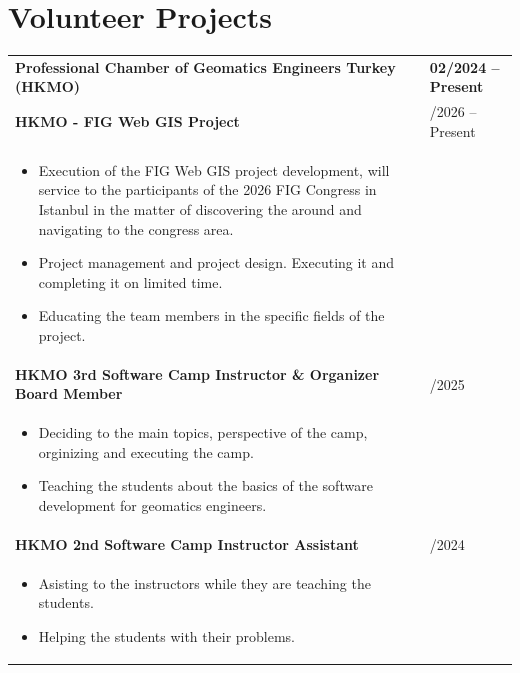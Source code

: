 \documentclass[10pt,a4paper]{article}
\begin{document}
\vspace{-5pt}

\section{Volunteer Projects}
\vspace{-5pt}
\begin{longtable}{@{} p{} | >{\centering\arraybackslash}p{} @{}}
  \textbf{Professional Chamber of Geomatics Engineers Turkey (HKMO) } & \textbf{02/2024 -- Present} \\
  \quad \textbf{\color{cvblue}HKMO - FIG Web GIS Project} & 03/2026 -- Present \\ [-5pt]
  \begin{itemize}
    \item Execution of the FIG Web GIS project development, will service to the participants of the 2026 FIG Congress in Istanbul in the matter of discovering the around and navigating to the congress area.
    \item Project management and project design. Executing it and completing it on limited time.
    \item Educating the team members in the specific fields of the project.
  \end{itemize} & \\ [10pt]

  \vspace{-5pt}
  \quad \textbf{\color{cvblue}HKMO 3rd Software Camp Instructor \& Organizer Board Member} & 02/2025 \\ [-5pt]
  \begin{itemize}
    \item Deciding to the main topics, perspective of the camp, orginizing and executing the camp.
    \item Teaching the students about the basics of the software development for geomatics engineers.
  \end{itemize} & \\ [10pt]

  \vspace{-5pt}
  \quad \textbf{\color{cvblue}HKMO 2nd Software Camp Instructor Assistant} & 02/2024 \\ [-5pt]
  \begin{itemize}
    \item Asisting to the instructors while they are teaching the students.
    \item Helping the students with their problems.
  \end{itemize} & \\ [10pt]


\end{longtable}
\end{document}
